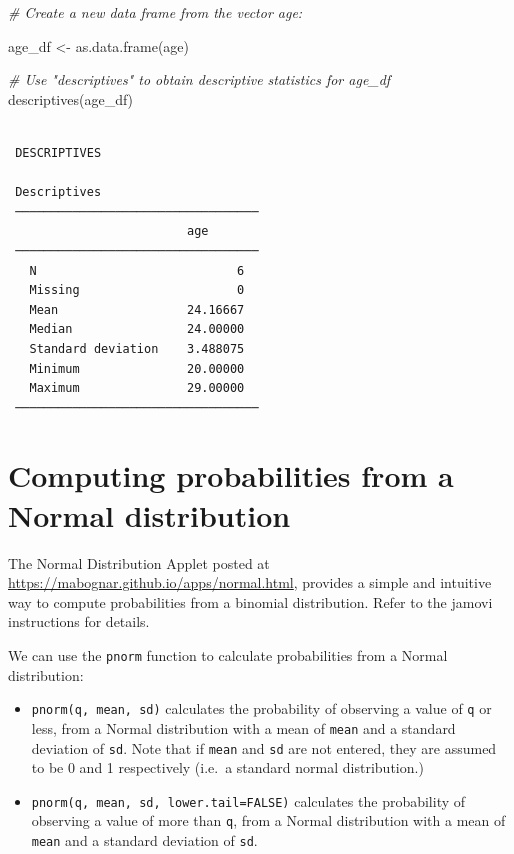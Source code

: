 \documentclass[
  a4paper,
]{memoir}
\newenvironment{Shaded}{\begin{snugshade}}{\end{snugshade}}
\newcommand{\CommentTok}[1]{\textcolor[rgb]{0.00,0.00,0.00}{\textit{#1}}}
\newcommand{\FunctionTok}[1]{\textcolor[rgb]{0.00,0.00,0.00}{#1}}
\newcommand{\NormalTok}[1]{\textcolor[rgb]{0.00,0.00,0.00}{#1}}
\newcommand{\OtherTok}[1]{\textcolor[rgb]{0.00,0.00,0.00}{#1}}
\providecommand{\tightlist}{%
  \setlength{\itemsep}{0pt}\setlength{\parskip}{0pt}}
\begin{document}
\begin{Shaded}
\begin{Highlighting}[]
\CommentTok{\# Create a new data frame from the vector age:}

\NormalTok{age\_df }\OtherTok{\textless{}{-}} \FunctionTok{as.data.frame}\NormalTok{(age)}

\CommentTok{\# Use "descriptives" to obtain descriptive statistics for age\_df}
\FunctionTok{descriptives}\NormalTok{(age\_df)}
\end{Highlighting}
\end{Shaded}

\begin{verbatim}

 DESCRIPTIVES

 Descriptives                       
 ────────────────────────────────── 
                         age        
 ────────────────────────────────── 
   N                            6   
   Missing                      0   
   Mean                  24.16667   
   Median                24.00000   
   Standard deviation    3.488075   
   Minimum               20.00000   
   Maximum               29.00000   
 ────────────────────────────────── 
\end{verbatim}

\section{Computing probabilities from a Normal
distribution}\label{sec-normal-r}

The Normal Distribution Applet posted at
\url{https://mabognar.github.io/apps/normal.html}, provides a simple and
intuitive way to compute probabilities from a binomial distribution.
Refer to the jamovi instructions for details.

We can use the \texttt{pnorm} function to calculate probabilities from a
Normal distribution:

\begin{itemize}
\tightlist
\item
  \texttt{pnorm(q,\ mean,\ sd)} calculates the probability of observing
  a value of \texttt{q} or less, from a Normal distribution with a mean
  of \texttt{mean} and a standard deviation of \texttt{sd}. Note that if
  \texttt{mean} and \texttt{sd} are not entered, they are assumed to be
  0 and 1 respectively (i.e.~a standard normal distribution.)
\item
  \texttt{pnorm(q,\ mean,\ sd,\ lower.tail=FALSE)} calculates the
  probability of observing a value of more than \texttt{q}, from a
  Normal distribution with a mean of \texttt{mean} and a standard
  deviation of \texttt{sd}.
\end{itemize}
\end{document}
